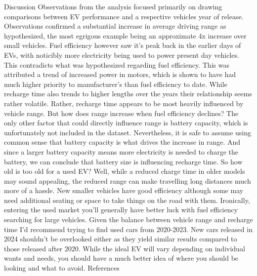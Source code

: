 \documentclass{article}
\begin{document}
{  \newpage
  \Large Discussion
  \newline \newline
  \normalsize Observations from the analysis focused primarily on drawing comparisons between EV performance and a respective
  vehicles year of release. Observations confirmed a substantial increase in average driving range as hypothesized, the most
  egrigous example being an approximate 4x increase over small vehicles. Fuel efficiency however saw it's peak back in the earlier
  days of EVs, with noticibly more electricity being used to power present day vehicles. This contradicts what was hypothesized
  regarding fuel efficiency. This was attributed a trend of increased power in motors, which is shown to have had much higher
  priority to manufacturer's than fuel efficiency to date. While recharge time also trends to higher lengths over the years their
  relationship seems rather volatile. Rather, recharge time appears to be most heavily influenced by vehicle range. But how does
  range increase when fuel efficiency declines? The only other factor that could directly influence range is battery capacity,
  which is unfortunately not included in the dataset. Nevertheless, it is safe to assume using common sense that battery capacity
  is what drives the increase in range. And since a larger battery capacity means more electricity is needed to charge the battery,
  we can conclude that battery size is influencing recharge time.
  \newline \newline
  So how old is too old for a used EV? Well, while a reduced charge time in older models may sound appealing, the reduced range can
  make travelling long distances much more of a hassle. New smaller vehicles have good efficiency although some may need additional
  seating or space to take things on the road with them. Ironically, entering the used market you'll generally have better luck
  with fuel efficiency searching for large vehicles. Given the balance between vehicle range and recharge time I'd recommend trying
  to find used cars from 2020-2023. New cars released in 2024 shouldn't be overlooked either as they yield similar results compared
  to those released after 2020. While the ideal EV will vary depending on individual wants and needs, you should have a much better
  idea of where you should be looking and what to avoid.
  \newline \newline
  \Large References
  \newline \newline \normalsize
}
\end{document}
